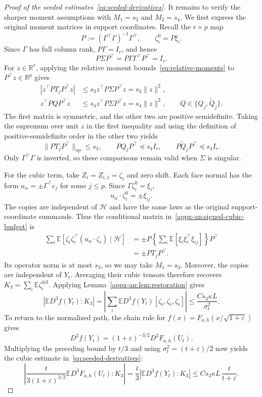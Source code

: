 \documentclass[11pt,letterpaper]{article}
\theoremstyle{remark}
\newcommand{\E}{\mathbb E}
\newcommand{\R}{\mathbb R}
\newcommand{\op}{\mathrm{op}}
\begin{document}
\begin{proof}[Proof of the seeded estimates~\eqref{eq:seeded-derivatives}]
It remains to verify the sharper moment assumptions with
$M_1=s_3$ and $M_2=s_4$. We first express the original moment
matrices in support coordinates. Recall the $r\times p$ map
\[
 P:=(\Gamma^\top\Gamma)^{-1}\Gamma^\top,
 \qquad \zeta_i^0=P\xi_i.
\]
Since $\Gamma$ has full column rank, $P\Gamma=I_r$, and hence
\[
 P\Sigma P^\top=P\Gamma\Gamma^\top P^\top=I_r.
\]
For $z\in\R^r$, applying the relative moment
bounds~\eqref{eq:relative-moments} to $P^\top z\in\R^p$ gives
\[
 \begin{aligned}
 |z^\top PT_jP^\top z|
 &\le s_3z^\top P\Sigma P^\top z=s_3\|z\|^2,\\
 z^\top PQP^\top z
 &\le s_4z^\top P\Sigma P^\top z=s_4\|z\|^2,
       \qquad Q\in\{Q_j,\widetilde Q_j\}.
 \end{aligned}
\]
The first matrix is symmetric, and the other two are positive
semidefinite. Taking the supremum over unit $z$ in the first
inequality and using the definition of positive-semidefinite
order in the other two yields
\[
 \|PT_jP^\top\|_{\op}\le s_3,\qquad
 PQ_jP^\top\preceq s_4I_r,\qquad
 P\widetilde Q_jP^\top\preceq s_4I_r.
\]
Only $\Gamma^\top\Gamma$ is inverted, so these comparisons
remain valid when $\Sigma$ is singular.

For the cubic term, take $Z_i=Z_{i,1}=\zeta_i$ and zero shift.
Each face normal has the form $u_\alpha=\pm\Gamma^\top e_j$
for some $j\le p$. Since $\Gamma\zeta_i^0=\xi_i$,
\[
 u_\alpha\cdot\zeta_i^0=\pm\xi_{ij}.
\]
The copies are independent of $\mathcal H$ and have the same
laws as the original support-coordinate summands. Thus the
conditional matrix in~\eqref{appx-an:signed-cubic-budget} is
\[
 \begin{aligned}
 \sum_i\E[\zeta_i\zeta_i^\top
                    (u_\alpha\cdot\zeta_i)\mid\mathcal H]
 &=\pm P\left\{\sum_i\E[\xi_i\xi_i^\top\xi_{ij}]\right\}P^\top\\
 &=\pm PT_jP^\top.
 \end{aligned}
\]
Its operator norm is at most $s_3$, so we may take $M_1=s_3$.
Moreover, the copies are independent of $Y_t$. Averaging their
cubic tensors therefore recovers
$K_3=\sum_i\E\zeta_i^{\otimes3}$. Applying
Lemma~\ref{appx-an:lem:restoration} gives
\[
 |\E D^3f(Y_t):K_3|
 =\left|\sum_i\E D^3f(Y_t)[\zeta_i,\zeta_i,\zeta_i]\right|
 \le\frac{Cs_3\kappa L}{\sigma_t^2}.
\]
To return to the normalized path, the chain rule for
$f(x)=F_{a,h}(x/\sqrt{1+\varepsilon})$ gives
\[
 D^3f(Y_t)=(1+\varepsilon)^{-3/2}D^3F_{a,h}(U_t).
\]
Multiplying the preceding bound by $t/3$ and using
$\sigma_t^2=(t+\varepsilon)/2$ now yields the cubic estimate
in~\eqref{eq:seeded-derivatives}:
\[
 \left|\frac{t}{3(1+\varepsilon)^{3/2}}
        \E D^3F_{a,h}(U_t):K_3\right|
 =\frac t3|\E D^3f(Y_t):K_3|
 \le Cs_3\kappa L\,\frac{t}{t+\varepsilon}.
\]


\end{proof}
\end{document}
